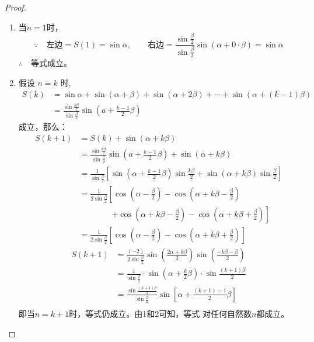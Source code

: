 \begin{proof}
\begin{enumerate}
    \item 当$n=1$时，
\[\because\quad \text{左边}=S(1)=\sin\alpha,\qquad \text{右边}=\frac{\sin\frac{\beta}{2}}{\sin\frac{\beta}{2}}\sin(\alpha+0\cdot \beta)=\sin\alpha\]
$\therefore\quad $等式成立。

\item 假设 $n=k$ 时,
\[\begin{split}
    S(k)&=\sin \alpha+\sin (\alpha+\beta)+\sin (\alpha+2 \beta)+\cdots+\sin (\alpha+(k-1) \beta) \\
&=\frac{\sin \frac{k \beta}{2}}{\sin \frac{\beta}{2}} \sin \left(a+\frac{k-1}{2} \beta\right)
\end{split}\]
成立，那么：
\[\begin{split}
    S(k+1)&= S(k)+\sin(\alpha+k\beta)\\
    &=\frac{\sin \frac{k \beta}{2}}{\sin \frac{\beta}{2}} \sin \left(a+\frac{k-1}{2} \beta\right)+\sin(\alpha+k\beta)\\
    &=\frac{1}{\sin \frac{\beta}{2}}\left[\sin\left(\alpha+\frac{k-1}{2}\beta\right)\sin\frac{k\beta}{2}+\sin(\alpha+k\beta)\sin\frac{\beta}{2}\right]\\
    &=\frac{1}{2\sin \frac{\beta}{2}}\left[\cos\left(\alpha-\frac{\beta}{2}\right)-\cos\left(\alpha+k\beta-\frac{\beta}{2}\right)\right. \\
    &\qquad \qquad \left. +\cos\left(\alpha+k\beta -\frac{\beta}{2}\right)-\cos\left(\alpha+k\beta+\frac{\beta}{2}\right)\right]\\
    &=\frac{1}{2\sin \frac{\beta}{2}}\left[\cos\left(\alpha-\frac{\beta}{2}\right)-\cos\left(\alpha+k\beta+\frac{\beta}{2}\right)\right]
\end{split}\]
\[\begin{split}
    S(k+1)&= \frac{(-2)}{2\sin \frac{\beta}{2}}\sin\left(\frac{2\alpha+k\beta}{2}\right)\sin\left(\frac{-k\beta-\beta}{2}\right)\\
    &=\frac{1}{\sin \frac{\beta}{2}}\cdot \sin\left(\alpha+\frac{k}{2}\beta\right)\cdot \sin\frac{(k+1)\beta}{2}\\
    &=\frac{\sin \frac{(k+1)\beta}{2}}{\sin \frac{\beta}{2}}\sin\left[\alpha+\frac{(k+1)-1}{2}\beta\right]\\
\end{split}\]
即当$n=k+1$时，等式仍成立。由1和2可知，等式
对任何自然数$n$都成立。
\end{enumerate}
\end{proof}

